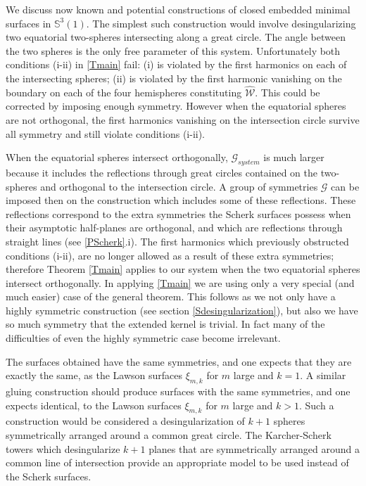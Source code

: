\documentclass[12pt,namelimits,sumlimits]{amsart}
\theoremstyle{remark}
\numberwithin{equation}{section}
\begin{document}
We discuss now known and potential constructions of closed embedded minimal surfaces in ${\mathbb{S}}^3(1)$.
The simplest such construction would involve desingularizing two equatorial two-spheres
intersecting along a great circle.
The angle between the two spheres is the only free parameter of this system.
Unfortunately both conditions (i-ii) in \ref{Tmain} fail:
(i) is violated by the first harmonics on 
each of the intersecting spheres;
(ii) is violated by the first harmonic vanishing on the boundary on each of the four
hemispheres constituting ${{\widehat{{\mathcal{W}}}}}$.
This could be corrected by imposing enough symmetry.
However when the equatorial spheres are not orthogonal,
the first harmonics vanishing on the intersection circle survive all symmetry
and still violate conditions (i-ii).

When the equatorial spheres intersect orthogonally,
${{\mathscr{G}_{system}}}$ is much larger because it includes the reflections through
great circles contained on the two-spheres and orthogonal to the intersection circle.
A group of symmetries ${{\mathscr{G}}}$ can be imposed then on the construction which includes
some of these reflections.
These reflections correspond to the extra symmetries the Scherk surfaces possess when their asymptotic
half-planes are orthogonal, and which are reflections through straight lines (see \ref{PScherk}.i).
The first harmonics which previously obstructed conditions (i-ii),
are no longer allowed as a result of
these extra symmetries;
therefore Theorem \ref{Tmain} applies to our system
when the two equatorial spheres intersect orthogonally.
In applying \ref{Tmain} we are using only a very special (and much easier) case of the general theorem.
This follows as we not only 
have a highly symmetric construction (see section \ref{Sdesingularization}),
but also we have so much symmetry that the extended kernel is trivial.
In fact many of the difficulties of even the highly symmetric case become irrelevant.

The surfaces obtained have the same symmetries,
and one expects that they are exactly the same,
as the Lawson surfaces $\xi_{m,k}$ \cite {L2} for $m$ large and $k=1$.
A similar gluing construction should produce surfaces with the same symmetries,
and one expects identical,
to the Lawson surfaces $\xi_{m,k}$ for $m$ large and $k>1$.
Such a construction would be considered a desingularization of $k+1$ spheres symmetrically
arranged around a common great circle.
The Karcher-Scherk towers \cite{Ka1} which desingularize $k+1$ planes
that are symmetrically arranged around a common line of intersection
provide an appropriate model to be used instead of the Scherk surfaces.
\end{document}
